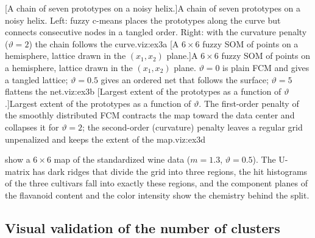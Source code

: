 [A chain of seven prototypes on a noisy helix.]{A chain of seven prototypes on a noisy helix. Left: fuzzy c-means places the prototypes along the curve but connects consecutive nodes in a tangled order. Right: with the curvature penalty ($\vartheta=2$) the chain follows the curve.}{viz:ex3a}
[A $6\times6$ fuzzy SOM of points on a hemisphere, lattice drawn in the $(x_1,x_2)$ plane.]{A $6\times6$ fuzzy SOM of points on a hemisphere, lattice drawn in the $(x_1,x_2)$ plane. $\vartheta=0$ is plain FCM and gives a tangled lattice; $\vartheta=0.5$ gives an ordered net that follows the surface; $\vartheta=5$ flattens the net.}{viz:ex3b}
[Largest extent of the prototypes as a function of $\vartheta$.]{Largest extent of the prototypes as a function of $\vartheta$. The first-order penalty of the smoothly distributed FCM contracts the map toward the data center and collapses it for $\vartheta=2$; the second-order (curvature) penalty leaves a regular grid unpenalized and keeps the extent of the map.}{viz:ex3d}

 show a $6\times6$ map of the standardized wine data ($m=1.3$, $\vartheta=0.5$). The U-matrix has dark ridges that divide the grid into three regions, the hit histograms of the three cultivars fall into exactly these regions, and the component planes of the flavanoid content and the color intensity show the chemistry behind the split.


\subsection{Visual validation of the number of clusters}

